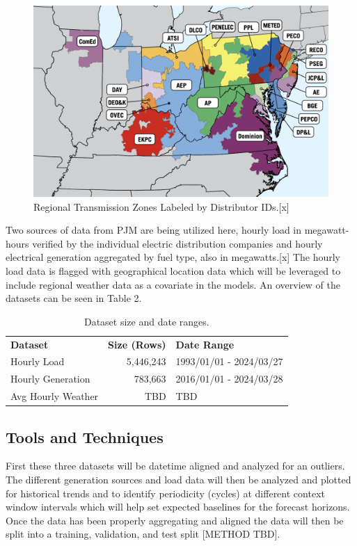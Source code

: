 \documentclass[sigconf]{acmart}
\begin{document}
  \begin{figure}
    \includegraphics[width=\columnwidth]{Images/Zones.png}
    \caption{Regional Transmission Zones Labeled by Distributor IDs.[x]}
    \Description{}
    \label{fig:zone}
  \end{figure}
  
  Two sources of data from PJM are being utilized here, hourly load in megawatt-hours verified by the individual electric distribution companies and hourly electrical generation aggregated by fuel type, also in megawatts.[x] The hourly load data is flagged with geographical location data which will be leveraged to include regional weather data as a covariate in the models. An overview of the datasets can be seen in Table 2.
  
\begin{table}[hbt!]
\centering
\caption{Dataset size and date ranges.}
\begin{tabular}{lrl}
\toprule
\textbf{Dataset} & \hfil \textbf{Size (Rows)} & \textbf{Date Range} \\
\cmidrule(rl){1-1}\cmidrule(rl){2-2}\cmidrule(rl){3-3}
  Hourly Load & 5,446,243 & 1993/01/01 - 2024/03/27 \\
  Hourly Generation & 783,663 & 2016/01/01 - 2024/03/28 \\   
  Avg Hourly Weather & TBD & TBD  \\   
  \bottomrule
\end{tabular}
\end{table}

  \subsection{Tools and Techniques}
  First these three datasets will be datetime aligned and analyzed for an outliers. The different generation sources and load data will then be analyzed and plotted for historical trends and to identify periodicity (cycles) at different context window intervals which will help set expected baselines for the forecast horizons. Once the data has been properly aggregating and aligned the data will then be split into a training, validation, and test split [METHOD TBD].
\end{document}
